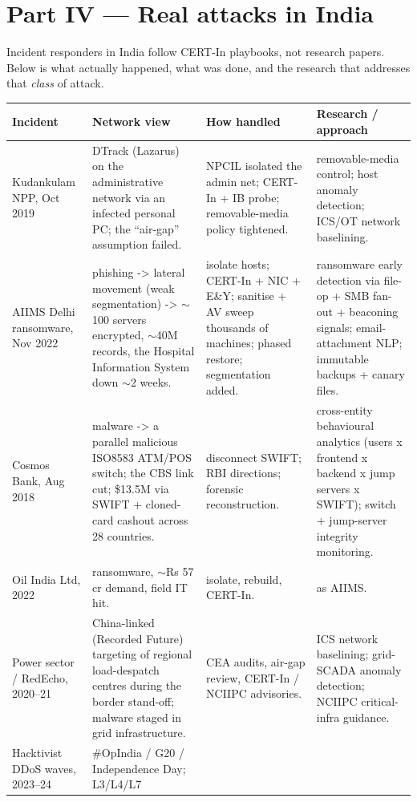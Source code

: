 \documentclass[11pt,a4paper]{article}
\begin{document}
\clearpage
\part*{Part IV --- Real attacks in India}

Incident responders in India follow CERT-In playbooks, not research papers.
Below is what actually happened, what was done, and the research that addresses
that \emph{class} of attack.

\begin{longtable}{@{}p{2.6cm}p{5.1cm}p{3.2cm}p{3.3cm}@{}}
\toprule
\textbf{Incident} & \textbf{Network view} & \textbf{How handled} & \textbf{Research / approach} \\
\midrule \endhead
\bottomrule \endfoot
Kudankulam NPP, Oct 2019 & DTrack (Lazarus) on the administrative network via an
infected personal PC; the ``air-gap'' assumption failed. & NPCIL isolated the
admin net; CERT-In + IB probe; removable-media policy tightened. & removable-media
control; host anomaly detection; ICS/OT network baselining. \\
AIIMS Delhi ransomware, Nov 2022 & phishing -> lateral movement (weak
segmentation) -> $\sim$100 servers encrypted, $\sim$40M records, the
Hospital Information System down $\sim$2 weeks. & isolate hosts; CERT-In + NIC +
E\&Y; sanitise + AV sweep thousands of machines; phased restore; segmentation
added. & ransomware early detection via file-op + SMB fan-out + beaconing
signals; email-attachment NLP; immutable backups + canary files. \\
Cosmos Bank, Aug 2018 & malware -> a parallel malicious ISO8583
ATM/POS switch; the CBS link cut; \$13.5M via SWIFT + cloned-card cashout across
28 countries. & disconnect SWIFT; RBI directions; forensic reconstruction. &
cross-entity behavioural analytics (users x frontend x backend
x jump servers x SWIFT); switch + jump-server integrity monitoring. \\
Oil India Ltd, 2022 & ransomware, $\sim$Rs 57 cr demand, field IT hit. & isolate,
rebuild, CERT-In. & as AIIMS. \\
Power sector / RedEcho, 2020--21 & China-linked (Recorded Future) targeting of
regional load-despatch centres during the border stand-off; malware staged in
grid infrastructure. & CEA audits, air-gap review, CERT-In / NCIIPC advisories. &
ICS network baselining; grid-SCADA anomaly detection; NCIIPC critical-infra
guidance. \\
Hacktivist DDoS waves, 2023--24 & \#OpIndia / G20 / Independence Day; L3/L4/L7

\end{longtable}
\end{document}
